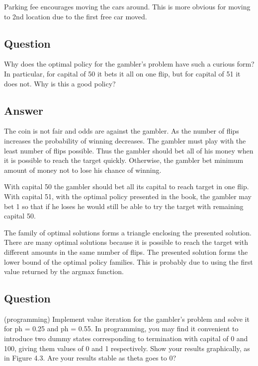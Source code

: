 \documentclass[11pt]{article}
\begin{document}
    Parking fee encourages moving the cars around.
    This is more obvious for moving to 2nd location due to the first free car moved.

    \subsection{Question}

    Why does the optimal policy for the gambler’s problem have such a curious form?
    In particular, for capital of 50 it bets it all on one flip, but for capital of 51 it does not.
    Why is this a good policy?

    \subsection*{Answer}

    The coin is not fair and odds are against the gambler.
    As the number of flips increases the probability of winning decreases.
    The gambler must play with the least number of flips possible.
    Thus the gambler should bet all of his money when it is possible to reach the target quickly.
    Otherwise, the gambler bet minimum amount of money not to lose his chance of winning.

    With capital 50 the gambler should bet all its capital to reach target in one flip.
    With capital 51, with the optimal policy presented in the book, the gambler may bet 1 so that if he loses he would still be able to try the target with remaining capital 50.

    The family of optimal solutions forms a triangle enclosing the presented solution.
    There are many optimal solutions because it is possible to reach the target with different amounts in the same number of flips.
    The presented solution forms the lower bound of the optimal policy families.
    This is probably due to using the first value returned by the argmax function.


    \subsection{Question}

    (programming) Implement value iteration for the gambler’s problem and solve it for ph = 0.25 and ph = 0.55.
    In programming, you may find it convenient to introduce two dummy states corresponding to termination with capital of 0 and 100, giving them values of 0 and 1 respectively.
    Show your results graphically, as in Figure 4.3.
    Are your results stable as theta goes to 0?
\end{document}
